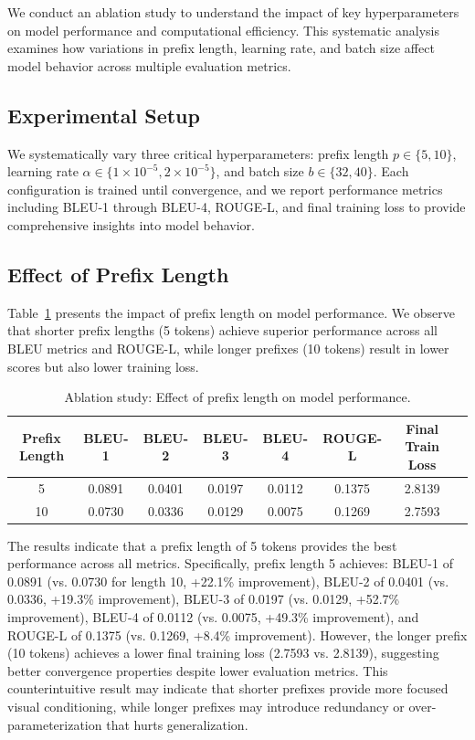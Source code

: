 \documentclass[runningheads]{llncs}
\begin{document}
We conduct an ablation study to understand the impact of key hyperparameters on model performance and computational efficiency. This systematic analysis examines how variations in prefix length, learning rate, and batch size affect model behavior across multiple evaluation metrics.

\subsection{Experimental Setup}

We systematically vary three critical hyperparameters: prefix length $p \in \{5, 10\}$, learning rate $\alpha \in \{1 \times 10^{-5}, 2 \times 10^{-5}\}$, and batch size $b \in \{32, 40\}$. Each configuration is trained until convergence, and we report performance metrics including BLEU-1 through BLEU-4, ROUGE-L, and final training loss to provide comprehensive insights into model behavior.

\subsection{Effect of Prefix Length}

Table~\ref{tab:ablation_prefix} presents the impact of prefix length on model performance. We observe that shorter prefix lengths (5 tokens) achieve superior performance across all BLEU metrics and ROUGE-L, while longer prefixes (10 tokens) result in lower scores but also lower training loss.

\begin{table}
\caption{Ablation study: Effect of prefix length on model performance.}\label{tab:ablation_prefix}
\begin{tabular}{|c|c|c|c|c|c|c|c|}
\hline
Prefix Length & BLEU-1 & BLEU-2 & BLEU-3 & BLEU-4 & ROUGE-L & Final Train Loss\\
\hline
5 & 0.0891 & 0.0401 & 0.0197 & 0.0112 & 0.1375 & 2.8139\\
10 & 0.0730 & 0.0336 & 0.0129 & 0.0075 & 0.1269 & 2.7593\\
\hline
\end{tabular}
\end{table}

The results indicate that a prefix length of 5 tokens provides the best performance across all metrics. Specifically, prefix length 5 achieves: BLEU-1 of 0.0891 (vs. 0.0730 for length 10, +22.1\% improvement), BLEU-2 of 0.0401 (vs. 0.0336, +19.3\% improvement), BLEU-3 of 0.0197 (vs. 0.0129, +52.7\% improvement), BLEU-4 of 0.0112 (vs. 0.0075, +49.3\% improvement), and ROUGE-L of 0.1375 (vs. 0.1269, +8.4\% improvement). However, the longer prefix (10 tokens) achieves a lower final training loss (2.7593 vs. 2.8139), suggesting better convergence properties despite lower evaluation metrics. This counterintuitive result may indicate that shorter prefixes provide more focused visual conditioning, while longer prefixes may introduce redundancy or over-parameterization that hurts generalization.
\end{document}
